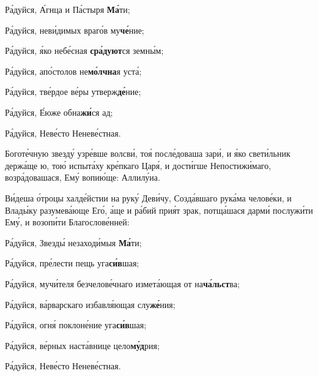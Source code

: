 \begin{russian}

  \KhorRaduisya Ра́дуйся, А́гнца и Па́стыря \textbf{Ма́}ти;


  Ра́дуйся, неви́димых враго́в му\textbf{че́}ние;


  Ра́дуйся, я́ко небе́сная \textbf{сра́дуют}ся земны́м;


  Ра́дуйся, апо́столов не\textbf{мо́лчна}я уста́;


  Ра́дуйся, тве́рдое ве́ры утверж\textbf{де́}ние;


  Ра́дуйся, Е́юже обна\textbf{жи́}ся ад;


  Ра́дуйся, Неве́сто Неневе́стная.


  \Ierei Боготе́чную звезду́ узре́вше волсви́, тоя́ после́доваша зари́, и я́ко свети́льник держа́ще ю, тою́ испыта́ху кре́пкаго Царя́, и дости́гше Непостижи́маго, возра́довашася, Ему́ вопию́ще: Аллилу́иа.


  \Ierei Ви́деша о́троцы халде́йстии на руку́ Деви́чу, Созда́вшаго рука́ма челове́ки, и Влады́ку разумева́юще Его́, а́ще и ра́бий прия́т зрак, потща́шася дарми́ послужи́ти Ему́, и возопи́ти Благослове́нней:

  \KhorRaduisya Ра́дуйся, Звезды́ незаходи́мыя \textbf{Ма́}ти;


  Ра́дуйся, пре́лести пещь уга\textbf{си́в}шая;


  Ра́дуйся, мучи́теля безчелове́чнаго измета́ющая от на\textbf{ча́льст}ва;


  Ра́дуйся, ва́рварскаго избавля́ющая слу\textbf{же́}ния;


  Ра́дуйся, огня́ поклоне́ние уга\textbf{си́в}шая;


  Ра́дуйся, ве́рных наста́внице цело\textbf{му́д}рия;


  Ра́дуйся, Неве́сто Неневе́стная.

\end{russian}

